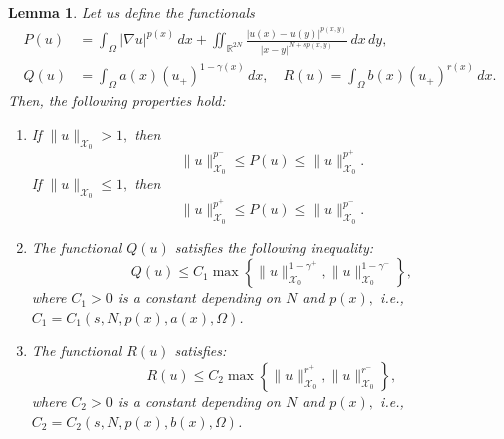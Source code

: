 \documentclass[11pt]{article}
\newtheorem{lemma}{Lemma}[section] %
\newcommand{\X}{\mathcal{X}_{0}}
\newcommand{\om} {\Omega}
\newcommand{\grad}{\nabla}
\begin{document}
\begin{lemma}\label{lm:norm_bounds}
Let us define the functionals
\begin{align*}
    P(u) & = 
\int_{\Omega} |\grad u|^{p(x)}\,dx 
+ \iint_{\mathbb{R}^{2N}} 
\frac{|u(x) - u(y)|^{p(x,y)}}
{|x - y|^{N + s p(x,y)}}\,dx\,dy,
 \\
    Q(u) & = 
\int_{\Omega} a(x) (u_+)^{1 - \gamma(x)}\,dx,
    \quad 
    R(u) = 
\int_{\Omega} b(x) (u_+)^{r(x)}\,dx.
\end{align*}
Then, the following properties hold:

\begin{enumerate}
    
\item[(i)] If $\|u\|_{\X} > 1,$
then
    \begin{equation*} 
        \|u\|_{\X}^{p^-} \leq P(u) 
        \leq \|u\|_{\X}^{p^+}.
    \end{equation*}
    If $\|u\|_{\X} \leq 1,$
then
    \begin{equation*} 
        \|u\|_{\X}^{p^+} \leq P(u) 
        \leq \|u\|_{\X}^{p^-}.
    \end{equation*}

    
\item[(ii)] The functional $Q(u)$
satisfies the following inequality:
    \begin{equation*}
        Q(u) \leq C_1 \max 
\left\{ \|u\|_{\X}^{1 - \gamma^+}, 
\|u\|_{\X}^{1 - \gamma^-} 
\right\},
    \end{equation*}
    where $C_1 > 0$
is a constant depending on $N$
and $p(x),$
i.e., $C_1 = C_1(s,N, p(x),a(x),\om)$.

    
\item[(iii)] The functional $R(u)$
satisfies:
    \begin{equation*} 
        R(u) \leq C_2 \max 
\left\{ \|u\|_{\X}^{r^+}, \|u\|_{\X}^{r^-} 
\right\},
    \end{equation*}
    where $C_2>0$
is a constant depending on $N$
and $p(x),$
i.e., $C_2 = C_2(s,N, p(x),b(x),\om)$.
\end{enumerate}
\end{lemma}
\end{document}
